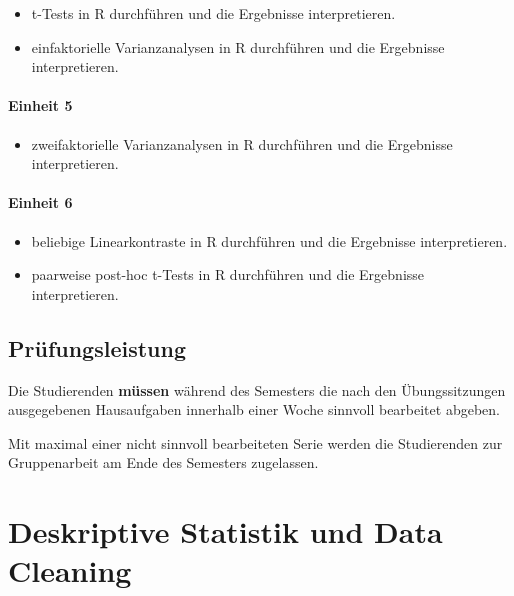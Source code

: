 \documentclass[
]{book}
\providecommand{\tightlist}{%
  \setlength{\itemsep}{0pt}\setlength{\parskip}{0pt}}
\begin{document}
\begin{itemize}
\tightlist
\item
  t-Tests in R durchführen und die Ergebnisse interpretieren.
\item
  einfaktorielle Varianzanalysen in R durchführen und die Ergebnisse interpretieren.
\end{itemize}

\hypertarget{einheit-5}{%
\subsubsection*{Einheit 5}\label{einheit-5}}

\begin{itemize}
\tightlist
\item
  zweifaktorielle Varianzanalysen in R durchführen und die Ergebnisse interpretieren.
\end{itemize}

\hypertarget{einheit-6}{%
\subsubsection*{Einheit 6}\label{einheit-6}}

\begin{itemize}
\tightlist
\item
  beliebige Linearkontraste in R durchführen und die Ergebnisse interpretieren.
\item
  paarweise post-hoc t-Tests in R durchführen und die Ergebnisse interpretieren.
\end{itemize}

\hypertarget{pruxfcfungsleistung}{%
\section{Prüfungsleistung}\label{pruxfcfungsleistung}}

Die Studierenden \textbf{müssen} während des Semesters die nach den Übungssitzungen ausgegebenen Hausaufgaben innerhalb einer Woche sinnvoll bearbeitet abgeben.

Mit maximal einer nicht sinnvoll bearbeiteten Serie werden die Studierenden zur Gruppenarbeit am Ende des Semesters zugelassen.

\hypertarget{deskriptive-statistik-und-data-cleaning}{%
\chapter{Deskriptive Statistik und Data Cleaning}\label{deskriptive-statistik-und-data-cleaning}}
\end{document}
